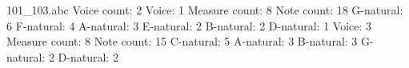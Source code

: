 101_103.abc
	Voice count: 2
	Voice: 1
		Measure count: 8
		Note count: 18
			G-natural: 6
			F-natural: 4
			A-natural: 3
			E-natural: 2
			B-natural: 2
			D-natural: 1
	Voice: 3
		Measure count: 8
		Note count: 15
			C-natural: 5
			A-natural: 3
			B-natural: 3
			G-natural: 2
			D-natural: 2

